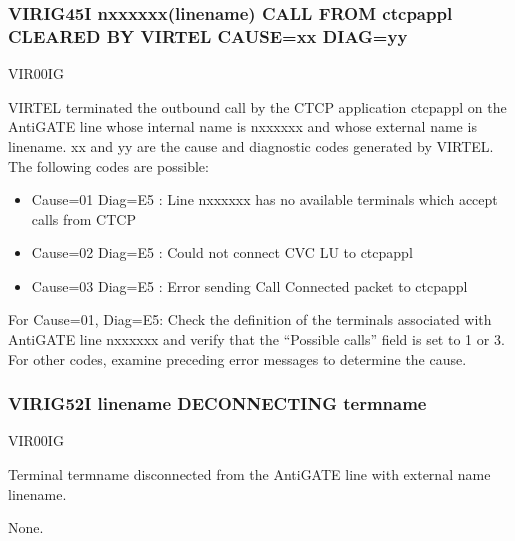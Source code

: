 \documentclass[letterpaper,10pt,english]{sphinxmanual}
\begin{document}
\subsubsection{VIRIG45I n\sphinxhyphen{}xxxxxx(linename) CALL FROM ctcpappl CLEARED BY VIRTEL CAUSE=xx DIAG=yy}
\label{\detokenize{messages:virig45i-n-xxxxxx-linename-call-from-ctcpappl-cleared-by-virtel-cause-xx-diag-yy}}\begin{description}
\sphinxAtStartPar
VIR00IG

\sphinxAtStartPar
VIRTEL terminated the outbound call by the CTCP application ctcpappl on the AntiGATE line whose internal name is n\sphinxhyphen{}xxxxxx and whose external name is linename. xx and yy are the cause and diagnostic codes generated by VIRTEL. The following codes are possible:
\begin{itemize}
\item {} 
\sphinxAtStartPar
Cause=01 Diag=E5 : Line n\sphinxhyphen{}xxxxxx has no available terminals which accept calls from CTCP

\item {} 
\sphinxAtStartPar
Cause=02 Diag=E5 : Could not connect CVC LU to ctcpappl

\item {} 
\sphinxAtStartPar
Cause=03 Diag=E5 : Error sending Call Connected packet to ctcpappl

\end{itemize}

\sphinxAtStartPar
For Cause=01, Diag=E5: Check the definition of the terminals associated with AntiGATE line n\sphinxhyphen{}xxxxxx and verify that the “Possible calls” field is set to 1 or 3. For other codes, examine preceding error messages to determine the cause.

\end{description}


\subsubsection{VIRIG52I linename DECONNECTING termname}
\label{\detokenize{messages:virig52i-linename-deconnecting-termname}}\begin{description}
\sphinxAtStartPar
VIR00IG

\sphinxAtStartPar
Terminal termname disconnected from the AntiGATE line with external name linename.

\sphinxAtStartPar
None.

\end{description}
\end{document}
